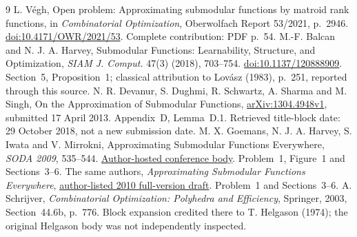 \documentclass[11pt]{article}
\begin{document}
\begin{thebibliography}{9}
\small
{} L. V\'egh, Open problem: Approximating submodular functions by matroid rank functions, in \emph{Combinatorial Optimization}, Oberwolfach Report 53/2021, p.~2946. \href{https://doi.org/10.4171/OWR/2021/53}{doi:10.4171/OWR/2021/53}. Complete contribution: PDF p.~54.
 M.-F. Balcan and N. J. A. Harvey, Submodular Functions: Learnability, Structure, and Optimization, \emph{SIAM J. Comput.} 47(3) (2018), 703--754. \href{https://doi.org/10.1137/120888909}{doi:10.1137/120888909}. Section~5, Proposition~1; classical attribution to Lov\'asz (1983), p.~251, reported through this source.
 N. R. Devanur, S. Dughmi, R. Schwartz, A. Sharma and M. Singh, On the Approximation of Submodular Functions, \href{https://arxiv.org/abs/1304.4948}{arXiv:1304.4948v1}, submitted 17 April 2013. Appendix~D, Lemma~D.1. Retrieved title-block date: 29 October 2018, not a new submission date.
 M. X. Goemans, N. J. A. Harvey, S. Iwata and V. Mirrokni, Approximating Submodular Functions Everywhere, \emph{SODA 2009}, 535--544. \href{https://www.cs.ubc.ca/~nickhar/papers/SubmodularEverywhere/SubmodularEverywhere.pdf}{Author-hosted conference body}. Problem~1, Figure~1 and Sections~3--6.
 The same authors, \emph{Approximating Submodular Functions Everywhere}, \href{https://www.cs.ubc.ca/~nickhar/papers/SubmodularEverywhere/SubmodularEverywhereFull.pdf}{author-listed 2010 full-version draft}. Problem~1 and Sections~3--6.
 A. Schrijver, \emph{Combinatorial Optimization: Polyhedra and Efficiency}, Springer, 2003, Section~44.6b, p.~776. Block expansion credited there to T. Helgason (1974); the original Helgason body was not independently inspected.
\end{thebibliography}
\end{document}
